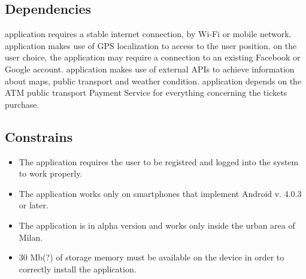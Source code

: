 \subsection{Dependencies}
\begin{itemize}
	\The application requires a stable internet connection, by Wi-Fi or mobile network.
	\The application makes use of GPS localization to access to the user position.
	\Based on the user choice, the application may require a connection to an existing Facebook or Google account.
	\The application makes use of external APIs to achieve information about maps, public transport and weather condition.
	\The application depends on the ATM public transport Payment Service for everything concerning the tickets purchase.
\end{itemize}
\subsection{Constrains}
\begin{itemize}
	\item The application requires the user to be registred and logged into the system to work properly.
	\item The application works only on smartphones that implement Android v. 4.0.3 or later.
	\item The application is in alpha version and works only inside the urban area of Milan.
	\item 30 Mb(?) of storage memory must be available on the device in order to correctly install the application.
\end{itemize}


